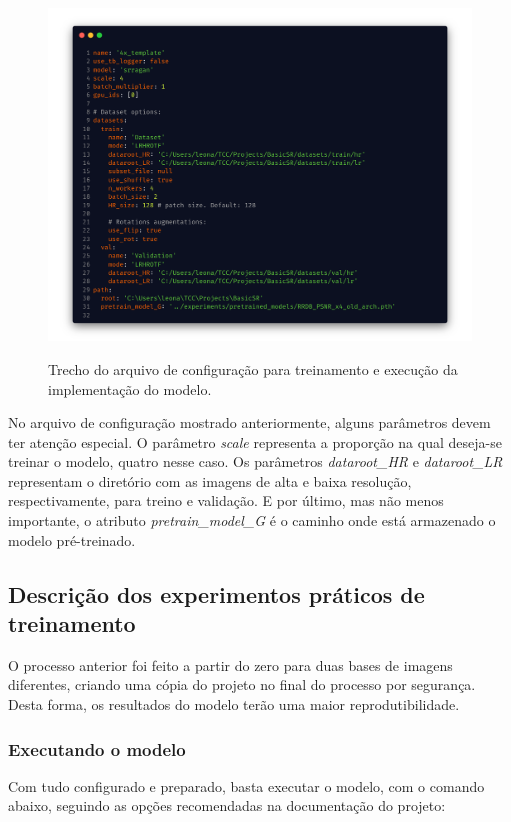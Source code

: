 \begin{figure}[H]
    \centering
    \caption{Trecho do arquivo de configuração para treinamento e execução da implementação do modelo.}
    \includegraphics[width=12cm]{fig/carbon_configuracao_basic_sr.png}
    \label{fig:fig29}
\end{figure}

No arquivo de configuração mostrado anteriormente, alguns parâmetros devem ter atenção especial. O parâmetro \textit{scale} representa a proporção na qual deseja-se treinar o modelo, quatro nesse caso. Os parâmetros \textit{dataroot\_HR} e \textit{dataroot\_LR} representam o diretório com as imagens de alta e baixa resolução, respectivamente, para treino e validação. E por último, mas não menos importante, o atributo \textit{pretrain\_model\_G} é o caminho onde está armazenado o modelo pré-treinado.


\subsection{Descrição dos experimentos práticos de treinamento}

O processo anterior foi feito a partir do zero para duas bases de imagens diferentes, criando uma cópia do projeto no final do processo por segurança. Desta forma, os resultados do modelo terão uma maior reprodutibilidade.

\subsubsection{Executando o modelo}

Com tudo configurado e preparado, basta executar o modelo, com o comando abaixo, seguindo as opções recomendadas na documentação do projeto:

